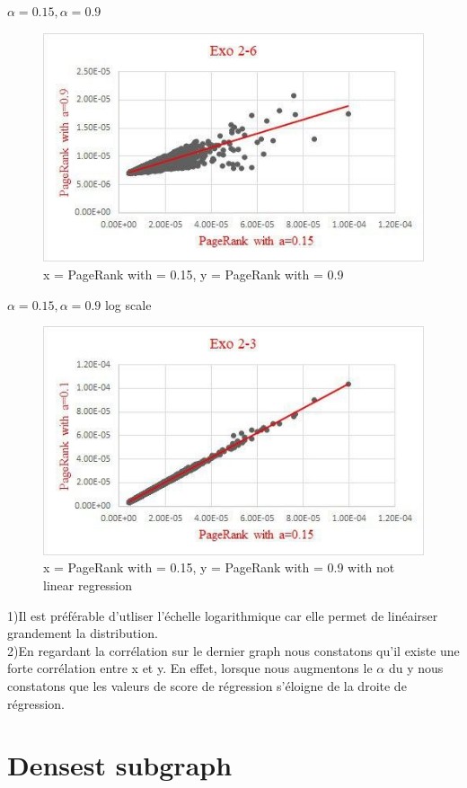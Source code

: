 \documentclass[a4paper,10pt]{report}
\begin{document}
$\alpha =0.15,\alpha=0.9$
\begin{figure}[H]
  \caption{x = PageRank with  = 0.15, y = PageRank with  = 0.9}
  \centering
    \includegraphics{./Datas/pageRank/pageRankAlpha015Alpha09.jpg}
\end{figure}
$\alpha =0.15,\alpha=0.9$ log scale
\begin{figure}[H]
  \caption{x = PageRank with  = 0.15, y = PageRank with  = 0.9 with not linear regression }
  \centering
    \includegraphics{./Datas/pageRank/pageRankAlpha015PageRankAlpha01.jpg}
\end{figure}
1)Il est préférable d'utliser l'échelle logarithmique car elle permet de linéairser grandement la distribution.\\
2)En regardant la corrélation sur le dernier graph nous constatons qu'il existe une forte corrélation entre x et y. En effet, lorsque nous augmentons le $\alpha$ du y nous constatons que les valeurs de score de régression s'éloigne de la droite de régression.
\\
\chapter{Densest subgraph}
\end{document}
